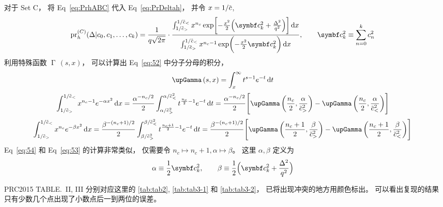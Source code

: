 对于 Set C，
将 Eq~\eqref{eq:PrhABC} 代入 Eq~\eqref{eq:PrDeltah}，
并令 $x=1/\dmscbar$,
\begin{equation}
  \label{eq:52}
  \dmspr_h^{(C)}(\Delta|\dmsccck) = \frac{1}{q\sqrt{2\pi}}\cdot\frac{
    \int_{1/\dmscbar_>}^{1/\dmscbar_<}x^{n_c}\exp\biggl[- \frac{x^2}{2}\Bigl(
    \dmsccckb^2+\frac{\Delta^2}{q^2}\Bigr)\biggr]\dmsdif x}{
    \int_{1/\dmscbar_>}^{1/\dmscbar_<}x^{n_c-1}\exp\biggl(- \frac{
      x^2}{2}\dmsccckb^2\biggr)\dmsdif x},
  \qquad \dmsccckb^2\equiv\sum_{n=0}^k c_n^2
\end{equation}
利用特殊函数 $\upGamma\,(s,x)$，
可以计算出 Eq~\eqref{eq:52} 中分子分母的积分，
\begin{equation}
  \label{eq:upGammasx}
  \upGamma\,(s,x) = \int_x^\infty t^{s-1}e^{-t}\dmsdif t
\end{equation}
\begin{equation}
  \label{eq:53}
  \int_{1/\dmscbar_>}^{1/\dmscbar_<}x^{n_c-1}e^{-\alpha x^2}\dmsdif x
  = \frac{\alpha^{-n_c/2}}{2}
  \int_{\alpha/\dmscbar_>^2}^{\alpha/\dmscbar_<^2}
    t^{ \frac{n_c}{2}-1}e^{-t}\dmsdif t
  = \frac{\alpha^{-n_c/2}}{2}
  \Biggl[\upGamma\,\biggl( \frac{n_c}{2},
    \frac{\alpha}{\dmscbar_>^2}\biggr)
      - \upGamma\,\biggl( \frac{n_c}{2},
      \frac{\alpha}{\dmscbar_<^2}\biggr)\Biggr]
\end{equation}
\begin{equation}
  \label{eq:54}
  \int_{1/\dmscbar_>}^{1/\dmscbar_<}x^{n_c}e^{-\beta x^2}\dmsdif x
  = \frac{\beta^{-(n_c+1)/2}}{2}
  \int_{\beta/\dmscbar_>^2}^{\beta/\dmscbar_<^2}
    t^{ \frac{n_c+1}{2}-1}e^{-t}\dmsdif t
  = \frac{\beta^{-(n_c+1)/2}}{2}
  \Biggl[\upGamma\,\biggl( \frac{n_c+1}{2},
    \frac{\beta}{\dmscbar_>^2}\biggr)
      - \upGamma\,\biggl( \frac{n_c+1}{2},
      \frac{\beta}{\dmscbar_<^2}\biggr)\Biggr]
\end{equation}
Eq~\eqref{eq:54} 和 Eq~\eqref{eq:53} 的计算非常类似，
仅需要令 $n_c\mapsto n_c+1, \alpha\mapsto\beta$。
这里 $\alpha,\beta$ 定义为
\begin{equation}
  \label{eq:55}
  \alpha\equiv \frac{1}{2}\dmsccckb^2,
  \qquad
  \beta\equiv \frac{1}{2}\Bigl(\dmsccckb^2+ \frac{\Delta^2}{q^2}
  \Bigr)
\end{equation}

PRC2015 TABLE.~II, III 分别对应这里的
\autoref{tab:tab2}, \autoref{tab:tab3-1} 和 \autoref{tab:tab3-2}，
已将出现冲突的地方用颜色标出。
可以看出复现的结果只有少数几个点出现了小数点后一到两位的误差。
